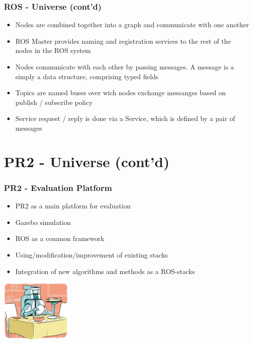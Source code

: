 \begin{frame}
  \frametitle{ROS - Universe (cont'd)}

\begin{itemize}
 \item Nodes are combined together into a graph and communicate with one another
 \item ROS Master provides naming and registration services to the rest of the nodes in the ROS system
 \item Nodes communicate with each other by passing messages. A message is a simply a data structure, comprising typed fields
 \item Topics are named buses over wich nodes exchange messanges based on publish / subscribe policy
 \item Service request / reply is done via a Service, which is defined by a pair of messages 
\end{itemize} 
\end{frame}

\section{PR2 - Universe (cont'd)}

\begin{frame}
  \frametitle{PR2 - Evaluation Platform}

\begin{itemize}
 \item PR2 as a main platform for evaluation
 \item Gazebo simulation
 \item ROS as a common framework
 \item Using/modification/improvement of existing stacks
 \item Integration of new algorithms and methods as a ROS-stacks   
\end{itemize}

\vspace{1ex}\hspace{42ex}\includegraphics[width=3.5cm]{../images/pr2_dinnertable.jpg} 
\end{frame}

